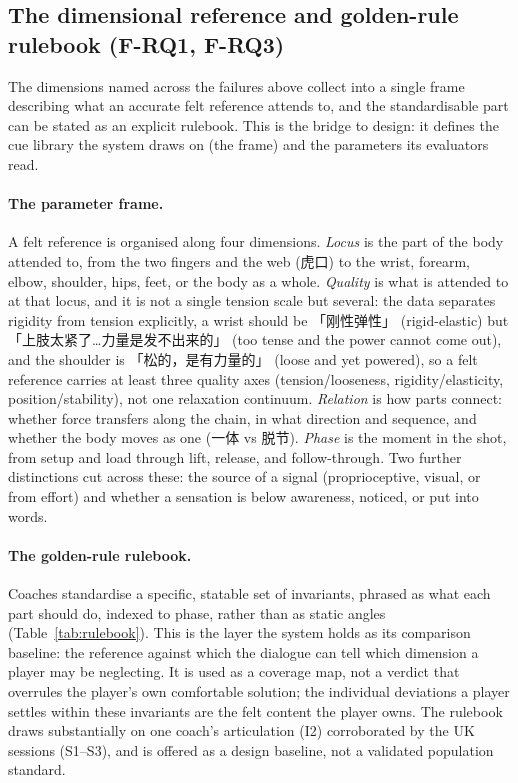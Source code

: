 \documentclass[sigconf]{acmart}
\begin{document}
\subsection{The dimensional reference and golden-rule rulebook (F-RQ1, F-RQ3)}
\label{sec:dimensional}

The dimensions named across the failures above collect into a single frame describing what an accurate felt reference attends to, and the standardisable part can be stated as an explicit rulebook. This is the bridge to design: it defines the cue library the system draws on (the frame) and the parameters its evaluators read.

\paragraph{The parameter frame.} A felt reference is organised along four dimensions. \emph{Locus} is the part of the body attended to, from the two fingers and the web (虎口) to the wrist, forearm, elbow, shoulder, hips, feet, or the body as a whole. \emph{Quality} is what is attended to at that locus, and it is not a single tension scale but several: the data separates rigidity from tension explicitly, a wrist should be 「刚性弹性」 (rigid-elastic) but 「上肢太紧了…力量是发不出来的」 (too tense and the power cannot come out), and the shoulder is 「松的，是有力量的」 (loose and yet powered), so a felt reference carries at least three quality axes (tension/looseness, rigidity/elasticity, position/stability), not one relaxation continuum. \emph{Relation} is how parts connect: whether force transfers along the chain, in what direction and sequence, and whether the body moves as one (一体 vs 脱节). \emph{Phase} is the moment in the shot, from setup and load through lift, release, and follow-through. Two further distinctions cut across these: the source of a signal (proprioceptive, visual, or from effort) and whether a sensation is below awareness, noticed, or put into words.

\paragraph{The golden-rule rulebook.} Coaches standardise a specific, statable set of invariants, phrased as what each part should do, indexed to phase, rather than as static angles (Table~\ref{tab:rulebook}). This is the layer the system holds as its comparison baseline: the reference against which the dialogue can tell which dimension a player may be neglecting. It is used as a coverage map, not a verdict that overrules the player's own comfortable solution; the individual deviations a player settles within these invariants are the felt content the player owns. The rulebook draws substantially on one coach's articulation (I2) corroborated by the UK sessions (S1--S3), and is offered as a design baseline, not a validated population standard.
\end{document}
